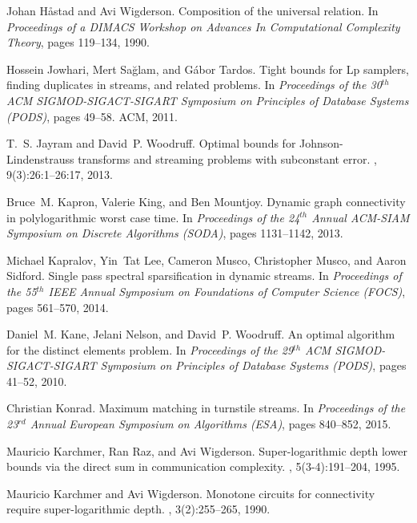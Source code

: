 \documentclass[11pt]{article}
\begin{document}
\begin{thebibliography}{GMWW14}
Johan H{\aa}stad and Avi Wigderson.
\newblock Composition of the universal relation.
\newblock In {\em Proceedings of a {DIMACS} Workshop on Advances In
  Computational Complexity Theory}, pages 119--134, 1990.

Hossein Jowhari, Mert Sa{\u{g}}lam, and G{\'a}bor Tardos.
\newblock Tight bounds for {Lp} samplers, finding duplicates in streams, and
  related problems.
\newblock In {\em Proceedings of the 30$^{th}$ ACM SIGMOD-SIGACT-SIGART
  Symposium on Principles of Database Systems (PODS)}, pages 49--58. ACM, 2011.

T.~S. Jayram and David~P. Woodruff.
\newblock Optimal bounds for {Johnson}-{Lindenstrauss} transforms and streaming
  problems with subconstant error.
, 9(3):26:1--26:17, 2013.

Bruce~M. Kapron, Valerie King, and Ben Mountjoy.
\newblock Dynamic graph connectivity in polylogarithmic worst case time.
\newblock In {\em Proceedings of the 24$^{th}$ Annual {ACM-SIAM} Symposium on
  Discrete Algorithms (SODA)}, pages 1131--1142, 2013.

Michael Kapralov, Yin~Tat Lee, Cameron Musco, Christopher Musco, and Aaron
  Sidford.
\newblock Single pass spectral sparsification in dynamic streams.
\newblock In {\em Proceedings of the 55$^{th}$ {IEEE} Annual Symposium on
  Foundations of Computer Science (FOCS)}, pages 561--570, 2014.

Daniel~M. Kane, Jelani Nelson, and David~P. Woodruff.
\newblock An optimal algorithm for the distinct elements problem.
\newblock In {\em Proceedings of the 29$^{th}$ ACM SIGMOD-SIGACT-SIGART
  Symposium on Principles of Database Systems (PODS)}, pages 41--52, 2010.

Christian Konrad.
\newblock Maximum matching in turnstile streams.
\newblock In {\em Proceedings of the 23$^{rd}$ Annual European Symposium on
  Algorithms (ESA)}, pages 840--852, 2015.

Mauricio Karchmer, Ran Raz, and Avi Wigderson.
\newblock Super-logarithmic depth lower bounds via the direct sum in
  communication complexity.
, 5(3-4):191--204, 1995.

Mauricio Karchmer and Avi Wigderson.
\newblock Monotone circuits for connectivity require super-logarithmic depth.
, 3(2):255--265, 1990.


\end{thebibliography}
\end{document}
